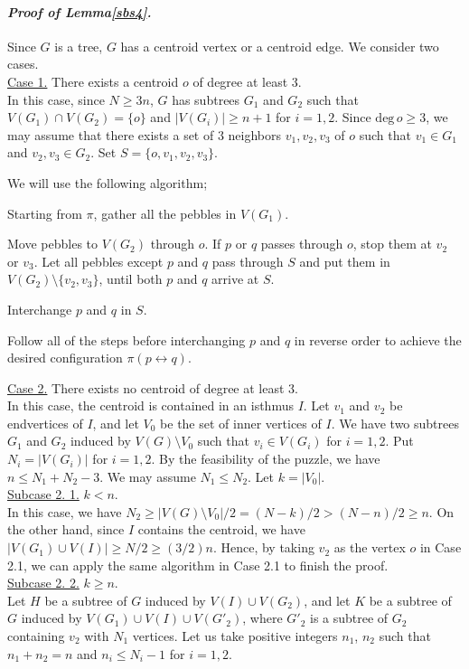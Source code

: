 \documentclass[letter,11pt]{article}
\newcommand{\white}{\qquad{\framebox{\rule{0pt}{4pt}}}}
\newcommand{\owari}{\hfill\white}
\theoremstyle{definition}
\theoremstyle{definition}
\newcommand{\1}{\boldmath$~1~$\unboldmath}
\newcommand{\qedgo}{\vspace{0.35cm}}
\newcommand{\tume}{\hspace*{0.2em}}
\def\deg{\textrm{deg}}
\newcommand{\maru}[1]{{\ooalign{\hfill$\small#1$\hfill\crcr\scalebox{1.3}{$\bigcirc$}}}}
\newenvironment{alg-enumerate}{%
  \begin{enumerate}%
   \renewcommand{\theenumi}{\arabic{enumi}}%
   \renewcommand{\labelenumi}{\rm{{\maru{\theenumi}}\tume\/}}%
   \renewcommand{\labelenumii}{\rm{$(${\maru{\theenumi}}-\theenumii$)$\tume\/}}%
 }{\end{enumerate}%
}
\newenvironment{Proofof}[1]{\expandafter
\paragraph{{\it Proof of #1.}}}{\hspace{5mm}\owari\qedgo}
\begin{document}
\begin{Proofof}{Lemma\tume\ref{sbs4}}
Since $G$ is a tree, $G$ has a centroid vertex or a centroid edge.
We consider two cases.
\medskip\\
\underline{Case 1.} There exists a centroid $o$ of degree at least $3$.
\medskip\\
In this case, since $N \ge 3n$, $G$ has subtrees $G_1$ and $G_2$ such that $V(G_1) \cap V(G_2) = \{ o \}$ and $|V(G_i)| \ge n + 1$ for $i=1, 2$.
Since $\deg \, o \ge 3$, we may assume that there exists a set of $3$ neighbors $v_1, v_2, v_3$ of $o$ such that $v_1 \in G_1$ and $v_2, v_3 \in G_2$.
Set $S = \{ o, v_1, v_2, v_3 \}$.

We will use the following algorithm;
\begin{alg-enumerate}
\item Starting from $\pi$, gather all the pebbles in $V(G_1)$.
\item Move pebbles to $V(G_2)$ through $o$.
If $p$ or $q$ passes through $o$, stop them at $v_2$ or $v_3$.
Let all pebbles except $p$ and $q$ pass through $S$ and put them in $V(G_2) \setminus \{ v_2, v _3 \}$, until both $p$ and $q$ arrive at $S$.
\item Interchange $p$ and $q$ in $S$.
\item Follow all of the steps before interchanging $p$ and $q$  in reverse order to achieve the desired configuration $\pi(p\leftrightarrow q)$.
\end{alg-enumerate}
\noindent
\underline{Case 2.} There exists no centroid of degree at least $3$.
\medskip\\  
In this case, the centroid is contained in an isthmus $I$.
Let $v_1$ and $v_2$ be endvertices of $I$, and let $V_0$ be the set of inner vertices of $I$.
We have two subtrees $G_1$ and $G_2$ induced by $V(G) \setminus V_0$ such that $v_i \in V(G_i)$ for $i = 1, 2$.
Put $N_i = |V(G_i)|$ for $i = 1, 2$.
By the feasibility of the puzzle, we have $n \le N_1 + N_2 - 3$.
We may assume $N_1 \le N_2$. 
Let $k= |V_0|$. 
\medskip\\
\underline{Subcase 2. 1.} $k < n$.
\medskip\\  
In this case, we have $N_2 \ge |V(G) \setminus V_0|/2 = (N-k)/2 > (N - n)/2 \ge n$.
On the other hand, since $I$ contains the centroid, we have $|V(G_1) \cup V(I)| \ge N/2 \ge (3/2)n$.
Hence, by taking $v_2$ as the vertex $o$ in Case 2.1, we can apply the same algorithm in Case 2.1 to finish the proof.
\medskip\\
\underline{Subcase 2. 2.} $k \ge n$.
\medskip\\
Let $H$ be a subtree of $G$ induced by $V(I) \cup V(G_2)$, and 
let $K$ be a subtree of $G$ induced by $V(G_1) \cup V(I) \cup V(G'_2)$, 
where $G'_2$ is a subtree of $G_2$ containing $v_2$ with $N_1$ vertices.
Let us take positive integers $n_1$, $n_2$ such that $n_1 + n_2 = n$ and $n_i \le N_i - 1$ for $i=1,2$.  


\end{Proofof}
\end{document}

